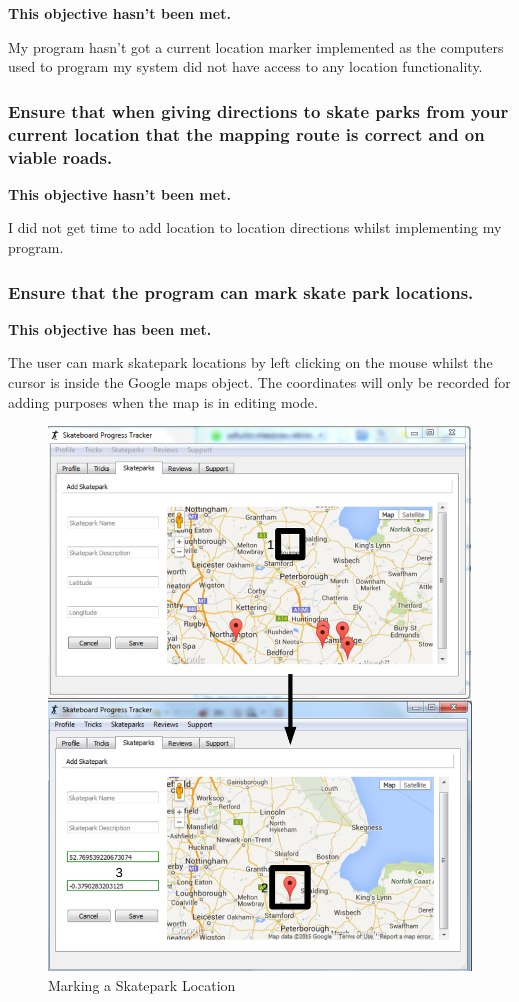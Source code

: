 \textbf{This objective hasn't been met.}

My program hasn't got a current location marker implemented as the computers used to program my system did not have access to any location functionality.

\subsubsection {Ensure that when giving directions to skate parks from your current location that the mapping route is correct and on viable roads. }

\textbf{This objective hasn't been met.}

I did not get time to add location to location directions whilst implementing my program.

\subsubsection {Ensure that the program can mark skate park locations.}

\textbf{This objective has been met.}

The user can mark skatepark locations by left clicking on the mouse whilst the cursor is inside the Google maps object. The coordinates will only be recorded for adding purposes when the map is in editing mode.

\begin{figure}[H]
    \includegraphics[width=\textwidth]{./Evaluation/images/MarkerEvidence.pdf}
    \caption{Marking a Skatepark Location} \label{fig:MarkerEvidence}
\end{figure}

